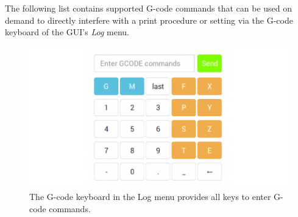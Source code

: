 The following list contains supported G-code commands that can be used on demand to directly interfere with a print procedure or setting via the G-code keyboard of the GUI's 
\emph{Log} menu. 

\begin{figure}[H]
  \centering
  \includegraphics[width=.7\linewidth]{./img/tt_gui-loggcodekeys.png}
  \caption{The G-code keyboard in the Log menu provides all keys to enter G-code commands.}
\end{figure}

